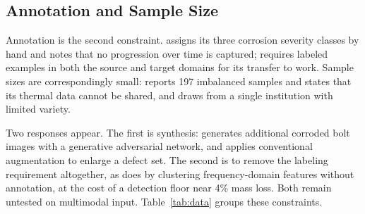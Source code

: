 \subsection{Annotation and Sample Size}

Annotation is the second constraint. \citet{Li2024b} assigns its three corrosion
severity classes by hand and notes that no progression over time is captured;
\citet{Gong2022} requires labeled examples in both the source and target domains for its
transfer to work. Sample sizes are correspondingly small: \citet{Persiya2025} reports 197
imbalanced samples and states that its thermal data cannot be shared, and
\citet{Morita2024} draws from a single institution with limited variety.

Two responses appear. The first is synthesis: \citet{Li2024b} generates additional
corroded bolt images with a generative adversarial network, and \citet{Sun2022} applies
conventional augmentation to enlarge a defect set. The second is to remove the
labeling requirement altogether, as \citet{Phannakham2026} does by clustering frequency-domain
features without annotation, at the cost of a detection floor near 4\% mass
loss. Both remain untested on multimodal input.
Table~\ref{tab:data} groups these constraints.


